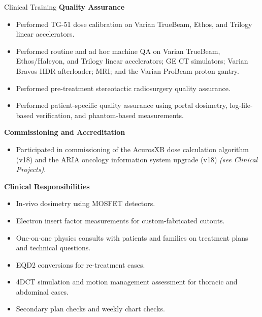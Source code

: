 \documentclass[
	11pt, %
]{resume} %
\begin{document}
\begin{rSection}{Clinical Training}
	\textbf{Quality Assurance}
	\vspace{-.2cm}
	\begin{itemize}[label=$\cdot$]
		\itemsep-0.5em
		\item Performed TG-51 dose calibration on Varian TrueBeam, Ethos, and Trilogy linear accelerators.
		\item Performed routine and ad hoc machine QA on Varian TrueBeam, Ethos/Halcyon, and Trilogy linear accelerators; GE CT simulators; Varian Bravos HDR afterloader; MRI; and the Varian ProBeam proton gantry.
		\item Performed pre-treatment stereotactic radiosurgery quality assurance.
		\item Performed patient-specific quality assurance using portal dosimetry, log-file-based verification, and phantom-based measurements.
	\end{itemize}
	
	\textbf{Commissioning and Accreditation}
	\vspace{-.2cm}
	\begin{itemize}[label=$\cdot$]
		\itemsep-0.5em
		\item Participated in commissioning of the AcurosXB dose calculation algorithm (v18) and the ARIA oncology information system upgrade (v18) \textit{(see Clinical Projects)}.
	\end{itemize}

	\textbf{Clinical Responsibilities}
	\vspace{-.2cm}
	\begin{itemize}[label=$\cdot$]
		\itemsep-0.5em
		\item In-vivo dosimetry using MOSFET detectors.
		\item Electron insert factor measurements for custom-fabricated cutouts.
		\item One-on-one physics consults with patients and families on treatment plans and technical questions.
		\item EQD2 conversions for re-treatment cases.
		\item 4DCT simulation and motion management assessment for thoracic and abdominal cases.
		\item Secondary plan checks and weekly chart checks.
	\end{itemize}

	

\end{rSection}
\vspace{0.5cm}

\end{document}
